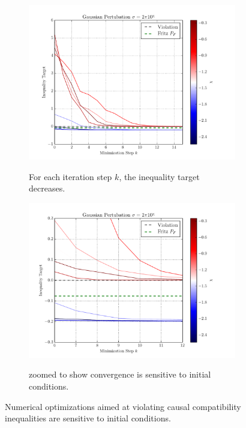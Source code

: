 \documentclass[aps, 10pt, english, twoside, pra, nofootinbib, tightenlines, longbibliography, superscriptaddress]{revtex4-1}
\begin{document}
    \begin{figure}
    \begin{subfigure}[t]{.48\linewidth}
    {\centering\includegraphics[width=\linewidth]{../../figures/optimizations/Gaussian_Perturbation_Fritz_Color_Default.pdf}}
    \caption{For each iteration step $k$, the inequality target decreases.}\label{fig:initial_conditions_a}
    \end{subfigure}
    \begin{subfigure}[t]{.48\linewidth}
    {\centering\includegraphics[width=\linewidth]{../../figures/optimizations/Gaussian_Perturbation_Fritz_Color_Zoomed.pdf}}
    \caption{ zoomed to show convergence is sensitive to initial conditions.}\label{fig:initial_conditions_b}
    \end{subfigure}
    \caption{Numerical optimizations aimed at violating causal compatibility inequalities are sensitive to initial conditions.}\label{fig:initial_conditions}
    \end{figure}
\end{document}
